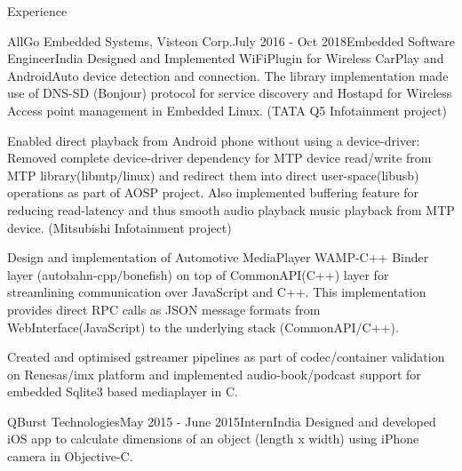 \documentclass[
	11pt, %
]{resume} %
\begin{document}
\begin{rSection}{Experience}
\begin{rSubsection}{AllGo Embedded Systems, Visteon Corp.}{July 2016 - Oct 2018}{Embedded Software Engineer}{India}
            Designed and Implemented WiFiPlugin for Wireless CarPlay and AndroidAuto device detection and connection. The library implementation made use of DNS-SD (Bonjour) protocol for service discovery and Hostapd for Wireless Access point management in Embedded Linux. (TATA Q5 Infotainment project) \hfill
            \bigskip\break
            
            Enabled direct playback from Android phone without using a device-driver: Removed complete device-driver dependency for MTP device read/write from MTP library(libmtp/linux) and redirect them into direct user-space(libusb) operations as part of AOSP project. Also implemented buffering feature for reducing read-latency and thus smooth audio playback music playback from MTP device. (Mitsubishi Infotainment project) \hfill
            \bigskip\break

            Design and implementation of Automotive MediaPlayer WAMP-C++ Binder layer (autobahn-cpp/bonefish) on top of CommonAPI(C++) layer for streamlining communication over JavaScript and C++. This implementation provides direct RPC calls as JSON message formats from WebInterface(JavaScript) to the underlying stack (CommonAPI/C++).
            \bigskip\break

            Created and optimised gstreamer pipelines as part of codec/container validation on Renesas/imx platform and implemented audio-book/podcast support for embedded Sqlite3 based mediaplayer in C.

	\end{rSubsection}

	\begin{rSubsection}{QBurst Technologies}{May 2015 - June 2015}{Intern}{India}
            Designed and developed iOS app to calculate dimensions of an object (length x width) using iPhone camera in Objective-C.

	\end{rSubsection}
 
\end{rSection}

\end{document}
